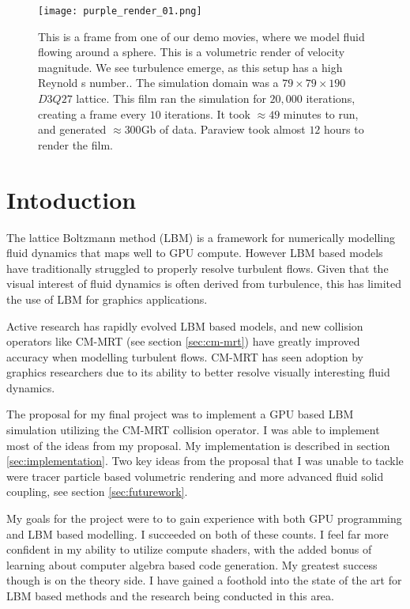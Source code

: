\begin{figure*}
\begin{center}
  \texttt{[image: purple\_render\_01.png]}
\end{center}
\caption{This is a frame from one of our demo movies,
  where we model fluid flowing around a sphere.
  This is a volumetric render of velocity magnitude. 
  We see turbulence emerge, as this setup has a high Reynold
  s number..
  The simulation domain was a $79 \times 79 \times 190$ 
  $D3Q27$ lattice. 
  This film ran the simulation for $20,000$ iterations,
  creating a frame every $10$ iterations.
It took $\approx 49$ minutes to run, 
and generated $\approx 300$Gb of data.
Paraview took almost $12$ hours to render the film.}
\label{fig:movie-frame}
\end{figure*}

\section{Intoduction}

The lattice Boltzmann method (LBM) 
is a framework for numerically modelling fluid dynamics
that maps well to GPU compute.
However LBM based models have traditionally struggled to 
properly resolve turbulent flows.
Given that the visual interest of fluid dynamics is often 
derived from turbulence, this has limited the use of LBM 
for graphics applications.

Active research has rapidly evolved LBM based models,
and new collision operators like CM-MRT (see section \ref{sec:cm-mrt})
have greatly improved accuracy when modelling turbulent flows.
CM-MRT has seen adoption by graphics 
researchers \cite{Li2020, Li2024, Lyu2021} due
to its ability to better resolve visually interesting
fluid dynamics.

The proposal for my final project was to
implement a GPU based LBM simulation utilizing the CM-MRT collision 
operator.
I was able to implement most of the ideas from
my proposal.
My implementation is described in section 
\ref{sec:implementation}.
Two key ideas from the proposal that I was unable to tackle
were tracer particle based volumetric rendering
and more advanced fluid solid coupling, see section \ref{sec:futurework}.

My goals for the project were to to gain experience with both GPU programming and 
LBM based modelling.
I succeeded on both of these counts.
I feel far more confident in my ability to utilize compute shaders,
with the added bonus of learning about computer algebra based
code generation.
My greatest success though is on the theory side.
I have gained a foothold into
the state of the art for LBM based methods and
the research being conducted in this area.
